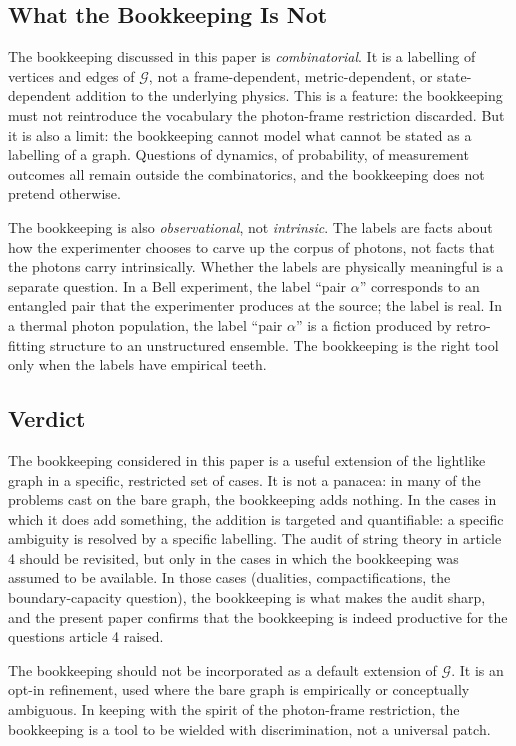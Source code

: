 \documentclass[11pt]{article}
\begin{document}
\subsection{What the Bookkeeping Is Not}

The bookkeeping discussed in this paper is \emph{combinatorial}. It is a labelling of vertices and edges of $\mathcal{G}$, not a frame-dependent, metric-dependent, or state-dependent addition to the underlying physics. This is a feature: the bookkeeping must not reintroduce the vocabulary the photon-frame restriction discarded. But it is also a limit: the bookkeeping cannot model what cannot be stated as a labelling of a graph. Questions of dynamics, of probability, of measurement outcomes all remain outside the combinatorics, and the bookkeeping does not pretend otherwise.

The bookkeeping is also \emph{observational}, not \emph{intrinsic}. The labels are facts about how the experimenter chooses to carve up the corpus of photons, not facts that the photons carry intrinsically. Whether the labels are physically meaningful is a separate question. In a Bell experiment, the label ``pair $\alpha$'' corresponds to an entangled pair that the experimenter produces at the source; the label is real. In a thermal photon population, the label ``pair $\alpha$'' is a fiction produced by retro-fitting structure to an unstructured ensemble. The bookkeeping is the right tool only when the labels have empirical teeth.

\subsection{Verdict}

The bookkeeping considered in this paper is a useful extension of the lightlike graph in a specific, restricted set of cases. It is not a panacea: in many of the problems cast on the bare graph, the bookkeeping adds nothing. In the cases in which it does add something, the addition is targeted and quantifiable: a specific ambiguity is resolved by a specific labelling. The audit of string theory in article 4 should be revisited, but only in the cases in which the bookkeeping was assumed to be available. In those cases (dualities, compactifications, the boundary-capacity question), the bookkeeping is what makes the audit sharp, and the present paper confirms that the bookkeeping is indeed productive for the questions article 4 raised.

The bookkeeping should not be incorporated as a default extension of $\mathcal{G}$. It is an opt-in refinement, used where the bare graph is empirically or conceptually ambiguous. In keeping with the spirit of the photon-frame restriction, the bookkeeping is a tool to be wielded with discrimination, not a universal patch.
\end{document}
